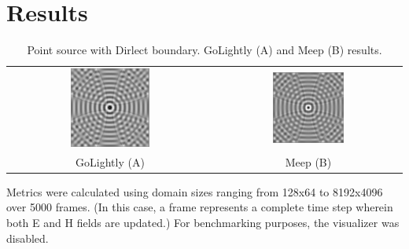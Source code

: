 \chapter{Results} \label{ch:conclusions}


\begin{table}
	\centering
	\label{tab:modelColorComponentUsage}
	\begin{tabular}{c | c}		
		\includegraphics[width=0.4\textwidth]{point-source-comparison-golightly.png} &  \includegraphics[width=0.4\textwidth]{point-source-comparison-meep.png} \\
		GoLightly (A) & Meep (B) \\
	\end{tabular}
	\caption{Point source with Dirlect boundary. GoLightly (A) and Meep (B) results.}
\end{table}



Metrics were calculated using domain sizes ranging from 128x64 to 8192x4096 over 5000 frames. (In this case, a frame represents a complete time step wherein both E and H fields are updated.) For benchmarking purposes, the visualizer was disabled.


